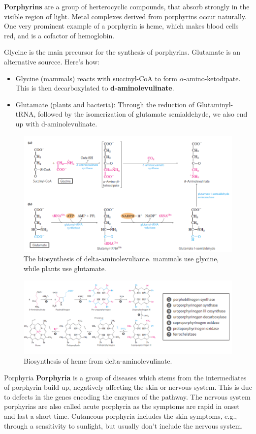 \documentclass[../main.tex]{subfiles}
\begin{document}
\textbf{\gls{Porphyrins}} are a group of herterocyclic compounds, that absorb strongly in the visible region of light. Metal complexes derived from porphyrins occur naturally. One very prominent example of a porphyrin is heme, which makes blood cells red, and is a cofactor of hemoglobin.

Glycine is the main precursor for the synthesis of porphyrins. Glutamate is an alternative sourcce. Here's how:
\begin{itemize}
	\item Glycine (mammals) reacts with succinyl-CoA to form $\alpha$-amino-ketodipate. This is then decarboxylated to \textbf{\gls{d-aminolevulinate}}.
	\item Glutamate (plants and bacteria): Through the reduction of Glutaminyl-tRNA, followed by the isomerization of glutamate semialdehyde, we also end up with d-aminolevulinate.
\end{itemize}

\begin{figure}[H]
	\centering
	\includegraphics[width=0.5\linewidth]{por_glyglu}
	\caption{The biosynthesis of delta-aminolevuliante. mammals use glycine, while plants use glutamate.}
	\label{fig:porglyglu}
\end{figure}

\begin{figure}[H]
	\centering
	\includegraphics[width=0.7\linewidth]{por_synth}
	\caption{Biosynthesis of heme from delta-aminolevulinate.}
	\label{fig:porsynth}
\end{figure}

\begin{RemarkWithTitel}{Porphyria}
	 \textbf{\gls{Porphyria}} is a group of diseases which stems from the intermediates of porphyrin build up, negatively affecting the skin or nervous system. This is due to defects in the genes encoding the enzymes of the pathway. The nervous system porphyrias are also called acute porphyria as the symptoms are rapid in onset and last a short time. Cutaneous porphyria includes the skin symptoms, e.g., through a sensitivity to sunlight, but usually don't include the nervous system.
\end{RemarkWithTitel}
\end{document}
